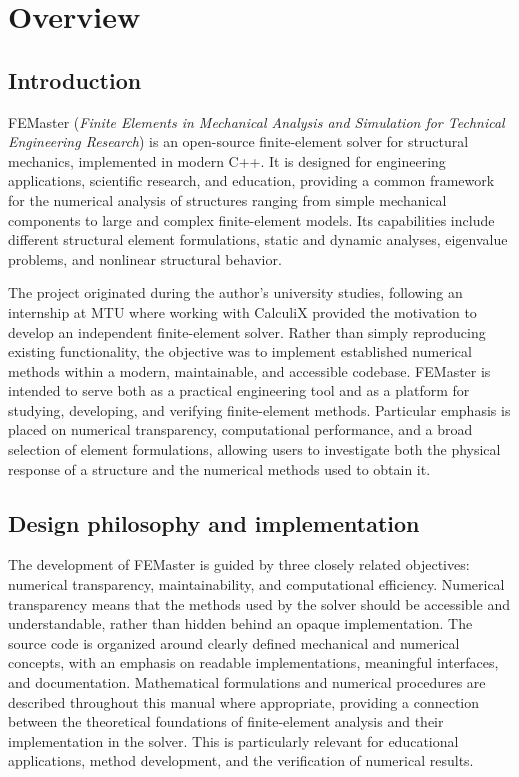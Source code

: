 
\chapter{Overview}
\label{chap:overview}

\section{Introduction}
\label{sec:introduction}

FEMaster (\emph{Finite Elements in Mechanical Analysis and Simulation for Technical Engineering Research}) is an open-source finite-element solver for structural mechanics, implemented in modern C++. It is designed for engineering applications, scientific research, and education, providing a common framework for the numerical analysis of structures ranging from simple mechanical components to large and complex finite-element models. Its capabilities include different structural element formulations, static and dynamic analyses, eigenvalue problems, and nonlinear structural behavior.

The project originated during the author's university studies, following an internship at MTU where working with CalculiX provided the motivation to develop an independent finite-element solver. Rather than simply reproducing existing functionality, the objective was to implement established numerical methods within a modern, maintainable, and accessible codebase. FEMaster is intended to serve both as a practical engineering tool and as a platform for studying, developing, and verifying finite-element methods. Particular emphasis is placed on numerical transparency, computational performance, and a broad selection of element formulations, allowing users to investigate both the physical response of a structure and the numerical methods used to obtain it.


\section{Design philosophy and implementation}

The development of FEMaster is guided by three closely related objectives: numerical transparency, maintainability, and computational efficiency. Numerical transparency means that the methods used by the solver should be accessible and understandable, rather than hidden behind an opaque implementation. The source code is organized around clearly defined mechanical and numerical concepts, with an emphasis on readable implementations, meaningful interfaces, and documentation. Mathematical formulations and numerical procedures are described throughout this manual where appropriate, providing a connection between the theoretical foundations of finite-element analysis and their implementation in the solver. This is particularly relevant for educational applications, method development, and the verification of numerical results.

